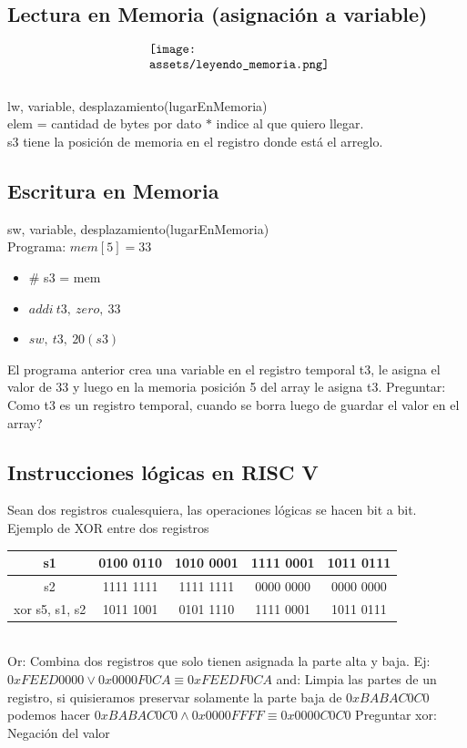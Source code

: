\documentclass[10pt,a4paper]{article}
\begin{document}
\subsection*{Lectura en Memoria (asignación a variable)}
\[\begin{minipage}[b]{0.4\textwidth}
    \texttt{[image: assets/leyendo\_memoria.png]}
    \label{fig:leyendo_memoria}
\end{minipage}\] 
lw, variable, desplazamiento(lugarEnMemoria) \\
elem = cantidad de bytes por dato \(\ast\) indice al que quiero llegar. \\
s3 tiene la posición de memoria en el registro donde está el arreglo. \\
\subsection*{Escritura en Memoria}
sw, variable, desplazamiento(lugarEnMemoria) \\
Programa: \(mem[5] = 33\) 
\begin{itemize}
    \item \# s3 = mem
    \item \(addi \ t3, \ zero,\ 33\)
    \item \(sw, \ t3, \ 20(s3)\)
\end{itemize}
El programa anterior crea una variable en el registro temporal t3, le asigna el valor de 33 y luego en la memoria posición 5 del array le asigna t3.
Preguntar: Como t3 es un registro temporal, cuando se borra luego de guardar el valor en el array? 
\subsection*{Instrucciones lógicas en RISC V}
Sean dos registros cualesquiera, las operaciones lógicas se hacen bit a bit. \\
Ejemplo de XOR entre dos registros
\begin{table}[h!]
    \centering
    \begin{tabular}{|c | c | c | c| c|}
    \hline
    s1 & 0100 0110 & 1010 0001 & 1111 0001 & 1011 0111 \\ \hline
    s2 & 1111 1111 & 1111 1111 & 0000 0000 & 0000 0000 \\ \hline
    xor s5, s1, s2 & 1011 1001 & 0101 1110 & 1111 0001 & 1011 0111 \\
    \hline
    \end{tabular}
    \label{tab:xor}
\end{table} 
\\
Or: Combina dos registros que solo tienen asignada la parte alta y baja. Ej: \(0xFEED0000 \lor 0x0000F0CA \equiv 0xFEEDF0CA \)  
and: Limpia las partes de un registro, si quisieramos preservar solamente la parte baja de \(0xBABAC0C0\) podemos hacer \(0xBABAC0C0 \land 0x0000FFFF \equiv 0x0000C0C0\) Preguntar 
xor: Negación del valor
\end{document}

